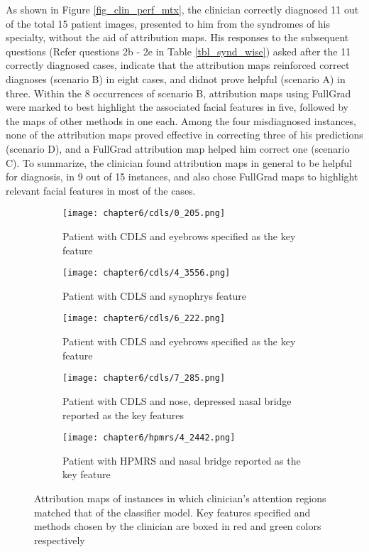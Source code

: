 \documentclass[../report.tex]{subfiles}
\begin{document}
  As shown in Figure \ref{fig_clin_perf_mtx}, the clinician correctly diagnosed 11 out of the total 15 patient images, presented to him from the syndromes of his specialty, without the aid of attribution maps. His responses to the subsequent questions (Refer questions 2b - 2e in Table \ref{tbl_synd_wise}) asked after the 11 correctly diagnosed cases, indicate that the attribution maps reinforced correct diagnoses (scenario B) in eight cases, and didnot prove helpful (scenario A) in  three. Within the 8 occurrences of scenario B, attribution maps using FullGrad were marked to best highlight the associated facial features in five, followed by the maps of other methods in one each. Among the four misdiagnosed instances, none of the attribution maps proved effective in correcting three of his predictions (scenario D), and a FullGrad attribution map helped him correct one (scenario C). 
  To summarize, the clinician found attribution maps in general to be helpful for diagnosis, in 9 out of 15 instances, and also chose FullGrad maps to highlight relevant facial features in most of the cases.
		\begin{figure}[H]
		\centering			
		\begin{subfigure}[t]{1\textwidth}
			\centering
			\texttt{[image: chapter6/cdls/0\_205.png]}
			\caption{Patient with CDLS and eyebrows specified as the key feature}
			\label{sfig_match_1}
		\end{subfigure}
		\begin{subfigure}[t]{1\textwidth}
			\centering
			\texttt{[image: chapter6/cdls/4\_3556.png]}
			\caption{Patient with CDLS and synophrys feature}
			\label{sfig_match_2}
		\end{subfigure}
		\begin{subfigure}[t]{1\textwidth}
			\centering
			\texttt{[image: chapter6/cdls/6\_222.png]}
			\caption{Patient with CDLS and eyebrows specified as the key feature}
			\label{sfig_match_3}
		\end{subfigure}
		\begin{subfigure}[t]{1\textwidth}
			\centering
			\texttt{[image: chapter6/cdls/7\_285.png]}
			\caption{Patient with CDLS and nose, depressed nasal bridge reported as the key features}
			\label{sfig_match_4}
		\end{subfigure}
		\begin{subfigure}[t]{1\textwidth}
		\centering
		\texttt{[image: chapter6/hpmrs/4\_2442.png]}
		\caption{Patient with HPMRS and nasal bridge reported as the key feature}
		\label{sfig_match_5}
		\end{subfigure}
		\caption[Attribution maps of instances in which clinician's attention regions matched that of the classifier model]{Attribution maps of instances in which clinician's attention regions matched that of the classifier model. Key features specified and methods chosen by the clinician are boxed in red and green colors respectively}
	\label{fig_match_cl_maps}
	\end{figure}
\end{document}

